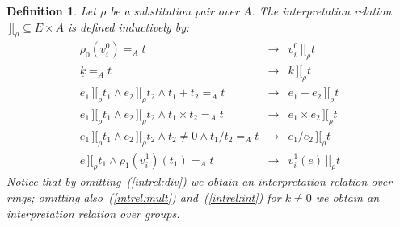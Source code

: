 \documentclass{article}
\newtheorem{definition}{Definition}[section]
\newcommand{\intII}{\,]\![}
\newcommand{\intrel}{\mathbin{\intII_{\rho}}}
\begin{document}
\begin{definition}\label{defn:intrel}
Let $\rho$ be a substitution pair over $A$.  The \emph{interpretation
relation} $\intrel\subseteq E\times A$ is defined inductively by:
\begin{eqnarray}
\label{intrel:var0}
\rho_0(v^0_i)=_A t & \rightarrow & v^0_i\intrel t\\
\label{intrel:int}
\underline k=_A t & \rightarrow & k\intrel t\\
\label{intrel:plus}
 e_1\intrel t_1 \wedge e_2\intrel t_2 \wedge t_1+t_2=_A t
& \rightarrow & e_1+e_2\intrel t\\
\label{intrel:mult}
 e_1\intrel t_1 \wedge e_2\intrel t_2 \wedge t_1\times t_2=_A t
& \rightarrow & e_1\times e_2\intrel t\\
\label{intrel:div}
 e_1\intrel t_1 \wedge e_2\intrel t_2 \wedge t_2\neq 0 \wedge t_1/t_2=_A t
& \rightarrow & e_1/e_2\intrel t\\
\label{intrel:var1}
 e\intrel t_1 \wedge \rho_1(v^1_i)(t_1)=_A t & \rightarrow & v^1_i(e)\intrel t
\end{eqnarray}
Notice that by omitting~(\ref{intrel:div}) we obtain an interpretation relation
over rings; omitting also~(\ref{intrel:mult}) and~(\ref{intrel:int}) for
$k\neq 0$ we obtain an interpretation relation over groups.
\end{definition}
\end{document}
